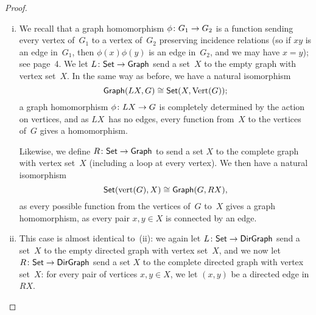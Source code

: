 \documentclass[../../solutions]{subfiles}
\begin{document}
\begin{proof}
\begin{enumerate}[(i)]
  \item We recall that a graph homomorphism ${\phi}\colon{G_1}\to{G_2}$ is
    a function sending every vertex of~$G_1$ to a vertex of~$G_2$
    preserving incidence relations (so if $xy$ is an edge in~$G_1$,
    then $\phi(x)\phi(y)$ is an edge in~$G_2$, and we may have $x=y$);
    see page~4.  We let ${L}\colon{\textsf{Set}}\to{\textsf{Graph}}$ send a set~$X$
    to the empty graph with vertex set~$X$.  In the same way as
    before, we have a natural isomorphism
    $$\textsf{Graph}(LX, G) \cong \textsf{Set}(X, \text{Vert}(G));$$
    a graph homomorphism ${\phi}\colon{LX}\to{G}$ is completely determined
    by the action on vertices, and as $LX$~has no edges, every
    function from~$X$ to the vertices of~$G$ gives a homomorphism.

    Likewise, we define ${R}\colon{\textsf{Set}}\to{\textsf{Graph}}$ to send a set
    $X$ to the complete graph with vertex set~$X$ (including a loop at
    every vertex).  We then have a natural isomorphism
    $$\textsf{Set}(\text{vert}(G), X) \cong \textsf{Graph}(G, RX),$$
    as every possible function from the vertices of~$G$ to~$X$ gives a
    graph homomorphism, as every pair $x,y\in X$ is connected by an
    edge.

  \item This case is almost identical to~(ii): we again let
    ${L}\colon{\textsf{Set}}\to{\textsf{DirGraph}}$ send a set~$X$ to the empty
    directed graph with vertex set~$X$, and we now let
    ${R}\colon{\textsf{Set}}\to{\textsf{DirGraph}}$ send a set $X$ to the complete
    directed graph with vertex set~$X$: for every pair of vertices
    $x,y\in X$, we let $(x,y)$ be a directed edge in $RX$.
  \end{enumerate}
\end{proof}
\end{document}
